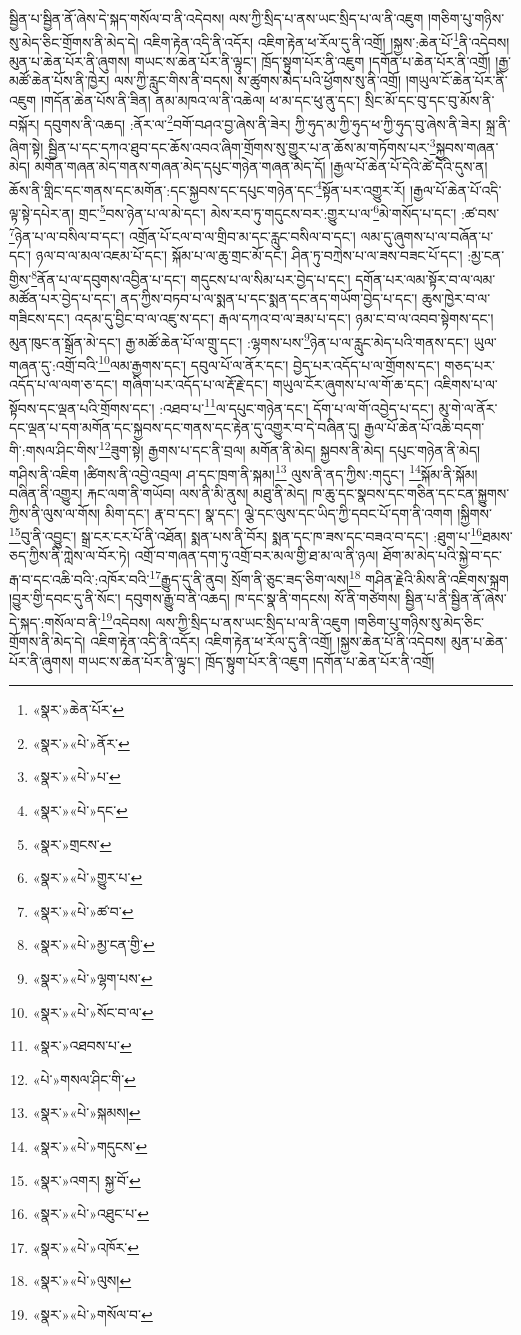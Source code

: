 སྦྱིན་པ་སྦྱིན་ནོ་ཞེས་དེ་སྐད་གསོལ་བ་ནི་འདེབས། ལས་ཀྱི་སྲིད་པ་ནས་ཡང་སྲིད་པ་ལ་ནི་འཇུག །གཅིག་པུ་གཉིས་སུ་མེད་ཅིང་གྲོགས་ནི་མེད་དེ། འཇིག་རྟེན་འདི་ནི་འདོར། འཇིག་རྟེན་ཕ་རོལ་དུ་ནི་འགྲོ། །སྐྱས་:ཆེན་པོ་\footnote{«སྣར་»ཆེན་པོར་}ནི་འདེབས། མུན་པ་ཆེན་པོར་ནི་ཞུགས། གཡང་ས་ཆེན་པོར་ནི་ལྟུང་། ཁྲོད་སྟུག་པོར་ནི་འཇུག །དགོན་པ་ཆེན་པོར་ནི་འགྲོ། །རྒྱ་མཚོ་ཆེན་པོས་ནི་ཁྱེར། ལས་ཀྱི་རླུང་གིས་ནི་བདས། ས་ཚུགས་མེད་པའི་ཕྱོགས་སུ་ནི་འགྲོ། །གཡུལ་ངོ་ཆེན་པོར་ནི་འཇུག །གདོན་ཆེན་པོས་ནི་ཟིན། ནམ་མཁའ་ལ་ནི་འཆེལ། ཕ་མ་དང་ཕུ་ནུ་དང་། སྲིང་མོ་དང་བུ་དང་བུ་མོས་ནི་བསྐོར། དབུགས་ནི་འཆད། :ནོར་ལ་\footnote{«སྣར་»«པེ་»ནོར་}བགོ་བཤའ་བྱ་ཞེས་ནི་ཟེར། ཀྱི་ཧུད་མ་ཀྱི་ཧུད་ཕ་ཀྱི་ཧུད་བུ་ཞེས་ནི་ཟེར། སྐྲ་ནི་ཞིག་སྟེ། སྦྱིན་པ་དང་དཀའ་ཐུབ་དང་ཆོས་འབའ་ཞིག་གྲོགས་སུ་གྱུར་པ་ན་ཆོས་མ་གཏོགས་པར་\footnote{«སྣར་»«པེ་»པ་}སྐྱབས་གཞན་མེད། མགོན་གཞན་མེད་གནས་གཞན་མེད་དཔུང་གཉེན་གཞན་མེད་དོ། །རྒྱལ་པོ་ཆེན་པོ་དེའི་ཚེ་དེའི་དུས་ན། ཆོས་ནི་གླིང་དང་གནས་དང་མགོན་:དང་སྐྱབས་དང་དཔུང་གཉེན་དང་\footnote{«སྣར་»«པེ་»དང་}སྟོན་པར་འགྱུར་རོ། །རྒྱལ་པོ་ཆེན་པོ་འདི་ལྟ་སྟེ་དཔེར་ན། གྲང་\footnote{«སྣར་»གྲངས་}བས་ཉེན་པ་ལ་མེ་དང་། མེས་རབ་ཏུ་གདུངས་བར་:གྱུར་པ་ལ་\footnote{«སྣར་»«པེ་»གྱུར་པ་}མེ་གསོད་པ་དང་། :ཚ་བས་\footnote{«སྣར་»«པེ་»ཚ་བ་}ཉེན་པ་ལ་བསིལ་བ་དང་། འགྲོན་པོ་ངལ་བ་ལ་གྲིབ་མ་དང་རླུང་བསིལ་བ་དང་། ལམ་དུ་ཞུགས་པ་ལ་བཞོན་པ་དང་། ཉལ་བ་ལ་མལ་འཇམ་པོ་དང་། སྐོམ་པ་ལ་ཆུ་གྲང་མོ་དང་། ཤིན་ཏུ་བཀྲེས་པ་ལ་ཟས་བཟང་པོ་དང་། :མྱ་ངན་གྱིས་\footnote{«སྣར་»«པེ་»མྱ་ངན་གྱི་}ནོན་པ་ལ་དབུགས་འབྱིན་པ་དང་། གདུངས་པ་ལ་སིམ་པར་བྱེད་པ་དང་། དགོན་པར་ལམ་སྟོར་བ་ལ་ལམ་མཚོན་པར་བྱེད་པ་དང་། ནད་ཀྱིས་བཏབ་པ་ལ་སྨན་པ་དང་སྨན་དང་ནད་གཡོག་བྱེད་པ་དང་། ཆུས་ཁྱེར་བ་ལ་གཟིངས་དང་། འདམ་དུ་བྱིང་བ་ལ་འཇུ་ས་དང་། རྒལ་དཀའ་བ་ལ་ཟམ་པ་དང་། ཉམ་ང་བ་ལ་འབབ་སྟེགས་དང་། མུན་ཁུང་ན་སྒྲོན་མེ་དང་། རྒྱ་མཚོ་ཆེན་པོ་ལ་གྲུ་དང་། :ལྷགས་པས་\footnote{«སྣར་»«པེ་»ལྷག་པས་}ཉེན་པ་ལ་རླུང་མེད་པའི་གནས་དང་། ཡུལ་གཞན་དུ་:འགྲོ་བའི་\footnote{«སྣར་»«པེ་»སོང་བ་ལ་}ལམ་རྒྱགས་དང་། དབུལ་པོ་ལ་ནོར་དང་། བྱེད་པར་འདོད་པ་ལ་གྲོགས་དང་། གཅད་པར་འདོད་པ་ལ་ལག་ཅ་དང་། གཞིག་པར་འདོད་པ་ལ་རྡོ་རྗེ་དང་། གཡུལ་ངོར་ཞུགས་པ་ལ་གོ་ཆ་དང་། འཇིགས་པ་ལ་སྟོབས་དང་ལྡན་པའི་གྲོགས་དང་། :འཐབ་པ་\footnote{«སྣར་»འཐབས་པ་}ལ་དཔུང་གཉེན་དང་། དོག་པ་ལ་གོ་འབྱེད་པ་དང་། མུ་གེ་ལ་ནོར་དང་ལྡན་པ་དག་མགོན་དང་སྐྱབས་དང་གནས་དང་རྟེན་དུ་འགྱུར་བ་དེ་བཞིན་དུ། རྒྱལ་པོ་ཆེན་པོ་འཆི་བདག་གི་:གསལ་ཤིང་གིས་\footnote{«པེ་»གསལ་ཤིང་གི་}ཟུག་སྟེ། རྒྱགས་པ་དང་ནི་བྲལ། མགོན་ནི་མེད། སྐྱབས་ནི་མེད། དཔུང་གཉེན་ནི་མེད། གཤིས་ནི་འཇིག །ཚིགས་ནི་འབྱེ་འབྲལ། ཤ་དང་ཁྲག་ནི་སྐམ།\footnote{«སྣར་»«པེ་»སྐམས།} ལུས་ནི་ནད་ཀྱིས་:གདུང་། \footnote{«སྣར་»«པེ་»གདུངས་}སྐོམ་ནི་སྐོམ། བཞིན་ནི་འགྱུར། རྐང་ལག་ནི་གཡོབ། ལས་ནི་མི་ནུས། མཐུ་ནི་མེད། ཁ་ཆུ་དང་སྣབས་དང་གཅིན་དང་ངན་སྐྱུགས་ཀྱིས་ནི་ལུས་ལ་གོས། མིག་དང་། རྣ་བ་དང་། སྣ་དང་། ལྕེ་དང་ལུས་དང་ཡིད་ཀྱི་དབང་པོ་དག་ནི་འགག །སྐྱིགས་\footnote{«སྣར་»འགར། སྐྱ་བོ་}བུ་ནི་འབྱུང་། སྒྲ་ངར་ངར་པོ་ནི་འཐོན། སྨན་པས་ནི་བོར། སྨན་དང་ཁ་ཟས་དང་བཟའ་བ་དང་། :ཐུག་པ་\footnote{«སྣར་»«པེ་»འཐུང་པ་}ཐམས་ཅད་ཀྱིས་ནི་ཀླེས་ལ་བོར་ཏེ། འགྲོ་བ་གཞན་དག་ཏུ་འགྲོ་བར་མལ་གྱི་ཐ་མ་ལ་ནི་ཉལ། ཐོག་མ་མེད་པའི་སྐྱེ་བ་དང་རྒ་བ་དང་འཆི་བའི་:འཁོར་བའི་\footnote{«སྣར་»«པེ་»འཁོར་}རྒྱུད་དུ་ནི་ནུབ། སྲོག་ནི་ཅུང་ཟད་ཅིག་ལས།\footnote{«སྣར་»«པེ་»ལུས།} གཤིན་རྗེའི་མིས་ནི་འཇིགས་སྐྲག །བྱུར་གྱི་དབང་དུ་ནི་སོང་། དབུགས་རྒྱུ་བ་ནི་འཆད། ཁ་དང་སྣ་ནི་གདངས། སོ་ནི་གཙེགས། སྦྱིན་པ་ནི་སྦྱིན་ནོ་ཞེས་དེ་སྐད་:གསོལ་བ་ནི་\footnote{«སྣར་»«པེ་»གསོལ་བ་}འདེབས། ལས་ཀྱི་སྲིད་པ་ནས་ཡང་སྲིད་པ་ལ་ནི་འཇུག །གཅིག་པུ་གཉིས་སུ་མེད་ཅིང་གྲོགས་ནི་མེད་དེ། འཇིག་རྟེན་འདི་ནི་འདོར། འཇིག་རྟེན་ཕ་རོལ་དུ་ནི་འགྲོ། །སྐྱས་ཆེན་པོ་ནི་འདེབས། མུན་པ་ཆེན་པོར་ནི་ཞུགས། གཡང་ས་ཆེན་པོར་ནི་ལྟུང་། ཁྲོད་སྟུག་པོར་ནི་འཇུག །དགོན་པ་ཆེན་པོར་ནི་འགྲོ། 